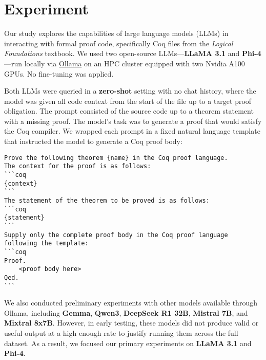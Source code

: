 
\section{Experiment}
\label{sec:experiment}

Our study explores the capabilities of large language models (LLMs) in interacting with formal proof code, specifically Coq files from the \textit{Logical Foundations} textbook. We used two open-source LLMs---\textbf{LLaMA 3.1} \cite{grattafiori2024llama3herdmodels} and \textbf{Phi-4} \cite{abdin2025phi4reasoningtechnicalreport}---run locally via \href{https://ollama.com}{Ollama} on an HPC cluster equipped with two Nvidia A100 GPUs. No fine-tuning was applied.

Both LLMs were queried in a \textbf{zero-shot} setting with no chat history,
where the model was given all code context from the start of the file up to a target proof obligation.
The prompt consisted of the source code up to a theorem statement with a missing proof. 
The model's task was to generate a proof that would satisfy the Coq compiler.
We wrapped each prompt in a fixed natural language template that instructed the model to generate a Coq proof body:
\begin{lstlisting}[basicstyle=\ttfamily\footnotesize,columns=fullflexible,frame=single,keepspaces=true]
Prove the following theorem {name} in the Coq proof language.
The context for the proof is as follows:
```coq
{context}
```
The statement of the theorem to be proved is as follows:
```coq
{statement}
```
Supply only the complete proof body in the Coq proof language following the template:
```coq
Proof.
    <proof body here>
Qed.
```
\end{lstlisting}

We also conducted preliminary experiments with other models available through Ollama,
including \textbf{Gemma}, \textbf{Qwen3}, \textbf{DeepSeek R1 32B}, \textbf{Mistral 7B}, and \textbf{Mixtral 8x7B}.
However, in early testing, these models did not produce valid or useful output at a high enough rate to justify running them across the full dataset.
As a result, we focused our primary experiments on \textbf{LLaMA 3.1} and \textbf{Phi-4}.

